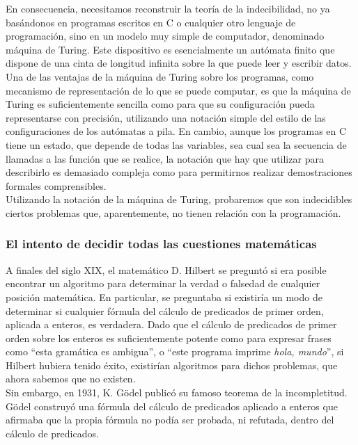 En consecuencia, necesitamos reconstruir la teoría de la indecibilidad, no ya basándonos en programas escritos en C o cualquier otro lenguaje de programación, sino en un modelo muy simple de computador, denominado máquina de Turing. Este dispositivo es esencialmente un autómata finito que dispone de una cinta de longitud infinita sobre la que puede leer y escribir datos. Una de las ventajas de la máquina de Turing sobre los programas, como mecanismo de representación de lo que se puede computar, es que la máquina de Turing es suficientemente sencilla como para que su configuración pueda representarse con precisión, utilizando una notación simple del estilo de las configuraciones de los autómatas a pila. En cambio, aunque los programas en C tiene un estado, que depende de todas las variables, sea cual sea la secuencia de llamadas a las función que se realice, la notación que hay que utilizar para describirlo es demasiado compleja como para permitirnos realizar demostraciones formales comprensibles.\\

Utilizando la notación de la máquina de Turing, probaremos que son indecidibles ciertos problemas que, aparentemente, no tienen relación con la programación.\\

\subsubsection{El intento de decidir todas las cuestiones matemáticas}

A finales del siglo XIX, el matemático D. Hilbert se preguntó si era posible encontrar un algoritmo para determinar la verdad o falsedad de cualquier posición matemática. En particular, se preguntaba si existiría un modo de determinar si cualquier fórmula del cálculo de predicados de primer orden, aplicada a enteros, es verdadera. Dado que el cálculo de predicados de primer orden sobre los enteros es suficientemente potente como para expresar frases como ``esta gramática es ambigua'', o ``este programa imprime \emph{hola, mundo}'', si Hilbert hubiera tenido éxito, existirían algoritmos para dichos problemas, que ahora sabemos que no existen.\\

Sin embargo, en 1931, K. Gödel publicó su famoso teorema de la incompletitud. Gödel construyó una fórmula del cálculo de predicados aplicado a enteros que afirmaba que la propia fórmula no podía ser probada, ni refutada, dentro del cálculo de predicados. \\

